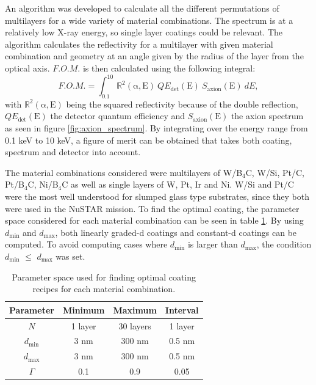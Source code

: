 An algorithm was developed to calculate all the different permutations of multilayers for a wide variety of material combinations. The spectrum is at a relatively low X-ray energy, so single layer coatings could be relevant. The algorithm calculates the reflectivity for a multilayer with given material combination and geometry at an angle given by the radius of the layer from the optical axis. $F.O.M.$ is then calculated using the following integral:
\begin{equation}\label{eq:fom}
	F.O.M. = \int_{0.1}^{10} \mathbb{R}^2(\mathrm{\alpha},\text{E})\ QE_{\text{det}}(\text{E})\ S_{\text{axion}}(\text{E})\ dE,
\end{equation}
with $\mathbb{R}^2(\mathrm{\alpha},\text{E})$ being the squared reflectivity because of the double reflection, $QE_{\text{det}}(\text{E})$ the detector quantum efficiency and $S_{\text{axion}}(\text{E})$ the axion spectrum as seen in figure \ref{fig:axion_spectrum}. By integrating over the energy range from 0.1 keV to 10 keV, a figure of merit can be obtained that takes both coating, spectrum and detector into account.

The material combinations considered were multilayers of W/B$_4$C, W/Si, Pt/C, Pt/B$_4$C, Ni/B$_4$C as well as single layers of W, Pt, Ir and Ni. W/Si and Pt/C were the most well understood for slumped glass type substrates, since they both were used in the NuSTAR mission. To find the optimal coating, the parameter space considered for each material combination can be seen in table \ref{tab:cast_parameter_space}. By using $d_{\text{min}}$ and $d_{\text{max}}$, both linearly graded-d coatings and constant-d coatings can be computed. To avoid computing cases where \(d_{\text{min}}\) is larger than \(d_{\text{max}}\), the condition \(d_{\text{min}}\) $\leq$ \(d_{\text{max}}\) was set.

\begin{table}[!h]
\begin{center}
\begin{tabular}{c|c|c|c}
Parameter & Minimum & Maximum & Interval \\
\hline
$N$ & 1 layer & 30 layers & 1 layer \\
$d_{\text{min}}$ & 3 nm & 300 nm & 0.5 nm \\
$d_{\text{max}}$ & 3 nm & 300 nm & 0.5 nm \\
$\Gamma$ & 0.1 & 0.9 & 0.05 \\
\end{tabular}
\end{center}
\caption{\footnotesize Parameter space used for finding optimal coating recipes for each material combination.}\label{tab:cast_parameter_space}
\end{table}

